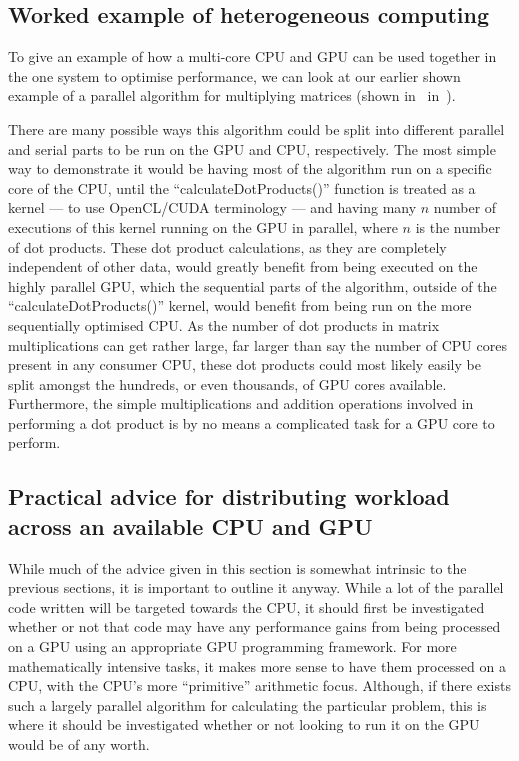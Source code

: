 \documentclass[a4paper,11pt]{article}
\begin{document}

\subsection{Worked example of heterogeneous computing} %
\label{sub:worked_example_of_heterogeneous_computing}
To give an example of how a multi-core CPU and GPU can be used together in the one system to optimise performance, we
can look at our earlier shown example of a parallel algorithm for multiplying matrices (shown in~
in~).

There are many possible ways this algorithm could be split into different parallel and serial parts to be run on the GPU
and CPU, respectively. The most simple way to demonstrate it would be having most of the algorithm run on a specific core
of the CPU, until the ``calculateDotProducts()'' function is treated as a kernel --- to use OpenCL/CUDA terminology ---
and having many $n$ number of executions of this kernel running on the GPU in parallel, where $n$ is the number of dot
products. These dot product calculations, as they are completely independent of other data, would greatly benefit from
being executed on the highly parallel GPU, which the sequential parts of the algorithm, outside of the ``calculateDotProducts()''
kernel, would benefit from being run on the more sequentially optimised CPU. As the number of dot products in matrix
multiplications can get rather large, far larger than say the number of CPU cores present in any consumer CPU, these
dot products could most likely easily be split amongst the hundreds, or even thousands, of GPU cores available. Furthermore,
the simple multiplications and addition operations involved in performing a dot product is by no means a complicated
task for a GPU core to perform.

\subsection{Practical advice for distributing workload across an available CPU and GPU} %
\label{sub:practical_advice_for_distributing_workload_across_an_available_cpu_and_gpu}
While much of the advice given in this section is somewhat intrinsic to the previous sections, it is important to outline
it anyway. While a lot of the parallel code written will be targeted towards the CPU, it should first be investigated
whether or not that code may have any performance gains from being processed on a GPU using an appropriate GPU programming
framework. For more mathematically intensive tasks, it makes more sense to have them processed on a CPU, with the CPU's
more ``primitive'' arithmetic focus. Although, if there exists such a largely parallel algorithm for calculating the
particular problem, this is where it should be investigated whether or not looking to run it on the GPU would be of any
worth.
\end{document}
